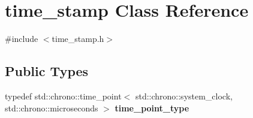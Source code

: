 \hypertarget{classtime__stamp}{
\section{time\_\-stamp Class Reference}
\label{classtime__stamp}
}


{\ttfamily \#include $<$time\_\-stamp.h$>$}\subsection*{Public Types}
\begin{DoxyCompactItemize}
\item 
\hypertarget{classtime__stamp_afe7f2c3cfd4ff4d4ca944eefe6aa4152}{
typedef std::chrono::time\_\-point$<$ std::chrono::system\_\-clock, std::chrono::microseconds $>$ {\bfseries time\_\-point\_\-type}}
\label{classtime__stamp_afe7f2c3cfd4ff4d4ca944eefe6aa4152}

\end{DoxyCompactItemize}
